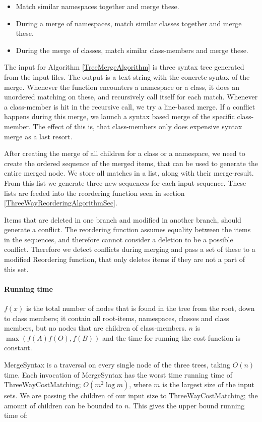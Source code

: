 \documentclass[11pt]{article}
\begin{document}
\begin{itemize}
   \item Match similar namespaces together and merge these.
   \item During a merge of namespaces, match similar classes together and merge these.
   \item During the merge of classes, match similar class-members and merge these.
\end{itemize}

The input for Algorithm \ref{TreeMergeAlgorithm} is three syntax tree generated from the input files. The output is a text string with the concrete syntax of the merge. Whenever the function encounters a namespace or a class, it does an unordered matching on these, and recursively call itself for each match. Whenever a class-member is hit in the recursive call, we try a line-based merge. If a conflict happens during this merge, we launch a syntax based merge of the specific class-member. The effect of this is, that class-members only does expensive syntax merge as a last resort.

After creating the merge of all children for a class or a namespace, we need to create the ordered sequence of the merged items, that can be used to generate the entire merged node. We store all matches in a list, along with their merge-result. From this list we generate three new sequences for each input sequence. These lists are feeded into the reordering function seen in section \ref{ThreeWayReorderingAlgorithmSec}.

Items that are deleted in one branch and modified in another branch, should generate a conflict. The reordering function assumes equality between the items in the sequences, and therefore cannot consider a deletion to be a possible conflict. Therefore we detect conflicts during merging and pass a set of these to a modified Reordering function, that only deletes items if they are not a part of this set.

\paragraph{Running time} $f(x)$ is the total number of nodes that is found in the tree from the root, down to class members; it contain all root-items, namespaces, classes and class members, but no nodes that are children of class-members. $n$ is $\max(f(A) f(O), f(B))$ and the time for running the cost function is constant. 

MergeSyntax is a traversal on every single node of the three trees, taking $O(n)$ time. Each invocation of MergeSyntax has the worst time running time of ThreeWayCostMatching; $O(m^2 \log m)$, where $m$ is the largest size of the input sets. We are passing the children of our input size to ThreeWayCostMatching; the amount of children can be bounded to $n$. This gives the upper bound running time of:
\end{document}
